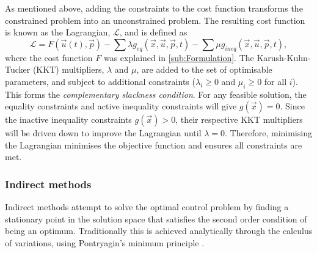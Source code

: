As mentioned above, %
adding the constraints to the cost function transforms the constrained problem into an unconstrained problem. The resulting cost function is known as the Lagrangian, $\mathcal{L}$, and is defined as
\begin{equation} \label{eq:Lagrangian}
\mathcal{L} = F(\vec{u}(t),\vec{p}) - \sum\lambda g_{eq}(\vec{x},\vec{u},\vec{p},t) - \sum\mu g_{ineq}(\vec{x},\vec{u},\vec{p},t),
\end{equation}
where the cost function $F$ was explained in \autoref{sub:Formulation}. The Karush-Kuhn-Tucker (KKT) multipliers, $\lambda$ and $\mu$, are added to the set of optimisable parameters, and subject to additional constraints ($\lambda_i\ge0$ and $\mu_i\ge0$ for all $i$). This forms the \emph{complementary slackness condition}. For any feasible solution, the equality constraints and active inequality constraints will give $g(\vec{x})=0$.  Since the inactive inequality constraints $g(\vec{x})>0$, their respective KKT multipliers will be driven down to improve the Lagrangian until $\lambda=0$. Therefore, minimising the Lagrangian minimises the objective function and ensures all constraints are met.

\subsubsection{Indirect methods}

Indirect methods attempt to solve the optimal control problem by finding a stationary point in the solution space that satisfies the second order condition of being an optimum. Traditionally this is achieved analytically through the calculus of variations, using Pontryagin's minimum principle \parencite{Pontryagin1962}. 

